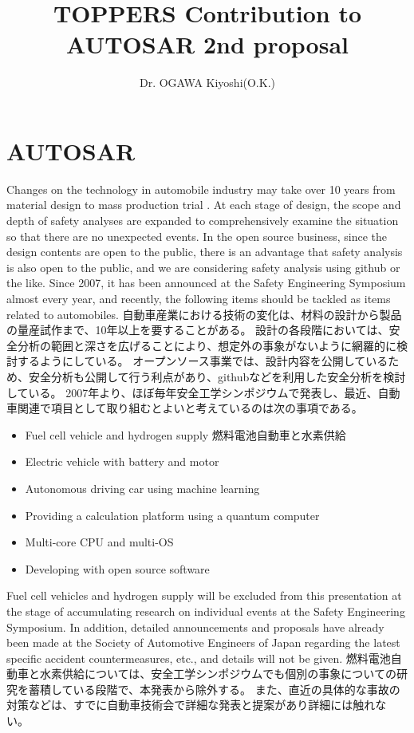 \documentclass[twocolumn]{article} %
\title{TOPPERS Contribution to AUTOSAR 2nd proposal}
\author{Dr. OGAWA Kiyoshi(O.K.)}
\begin{document}
\maketitle

\section{AUTOSAR}
Changes on the technology in automobile industry may take over 10 years from material design to mass production trial .
At each stage of design, the scope and depth of safety analyses are expanded to comprehensively examine the situation so that there are no unexpected events.
In the open source business, since the design contents are open to the public, there is an advantage that safety analysis is also open to the public, and we are considering safety analysis using github or the like.
Since 2007, it has been announced at the Safety Engineering Symposium almost every year, and recently, the following items should be tackled as items related to automobiles.
自動車産業における技術の変化は、材料の設計から製品の量産試作まで、10年以上を要することがある。
設計の各段階においては、安全分析の範囲と深さを広げることにより、想定外の事象がないように網羅的に検討するようにしている。
オープンソース事業では、設計内容を公開しているため、安全分析も公開して行う利点があり、githubなどを利用した安全分析を検討している。
2007年より、ほぼ毎年安全工学シンポジウムで発表し、最近、自動車関連で項目として取り組むとよいと考えているのは次の事項である。
\begin{itemize}
\item Fuel cell vehicle and hydrogen supply 燃料電池自動車と水素供給
\item Electric vehicle with battery and motor 
\item Autonomous driving car using machine learning
\item Providing a calculation platform using a quantum computer
\item Multi-core CPU and multi-OS
\item Developing with open source software
\end{itemize}
Fuel cell vehicles and hydrogen supply will be excluded from this presentation at the stage of accumulating research on individual events at the Safety Engineering Symposium.
In addition, detailed announcements and proposals have already been made at the Society of Automotive Engineers of Japan regarding the latest specific accident countermeasures, etc., and details will not be given.
燃料電池自動車と水素供給については、安全工学シンポジウムでも個別の事象についての研究を蓄積している段階で、本発表から除外する。\cite{anzen2018ando}
また、直近の具体的な事故の対策などは、すでに自動車技術会で詳細な発表と提案があり詳細には触れない\cite{kaminade2020}\cite{konuma2020}。
\end{document}
